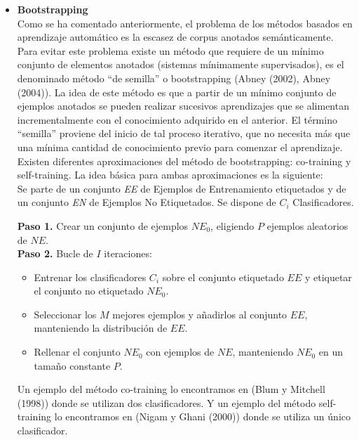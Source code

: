 \begin{itemize}
  \item \textbf{Bootstrapping} \\
  Como se ha comentado anteriormente, el problema de los métodos basados en aprendizaje automático es la escasez de corpus anotados semánticamente. Para evitar este problema existe un método que requiere de un mínimo conjunto de elementos anotados (sistemas mínimamente supervisados), es el denominado método “de semilla” o bootstrapping (Abney (2002), Abney (2004)). La idea de este método es que a partir de un mínimo conjunto de ejemplos anotados se pueden realizar sucesivos aprendizajes que se alimentan incrementalmente con el conocimiento adquirido en el anterior. El término “semilla” proviene del inicio de tal proceso iterativo, que no necesita más que una mínima cantidad de conocimiento previo para comenzar el aprendizaje. Existen diferentes aproximaciones del método de bootstrapping: co-training y self-training. La idea básica para ambas aproximaciones es la siguiente:\\
  Se parte de un conjunto \textit{EE} de Ejemplos de Entrenamiento etiquetados y de un conjunto \textit{EN} de Ejemplos No Etiquetados. Se dispone de $C_i$ Clasificadores.

  \textbf{Paso 1.} Crear un conjunto de ejemplos $NE_0$, eligiendo $P$ ejemplos aleatorios de $NE$.\\
  \textbf{Paso 2.} Bucle de $I$ iteraciones:
  \begin{itemize}
    \item Entrenar los clasificadores $C_i$ sobre el conjunto etiquetado $EE$ y etiquetar el conjunto no etiquetado $NE_0$.
    \item Seleccionar los $M$ mejores ejemplos y añadirlos al conjunto $EE$, manteniendo la distribución de $EE$.
    \item Rellenar el conjunto $NE_0$ con ejemplos de $NE$, manteniendo $NE_0$ en un tamaño constante $P$.
  \end{itemize}

  Un ejemplo del método co-training lo encontramos en (Blum y Mitchell (1998)) donde se utilizan dos clasificadores. Y un ejemplo del método self-training lo encontramos en (Nigam y Ghani (2000)) donde se utiliza un único clasificador.


\end{itemize}
